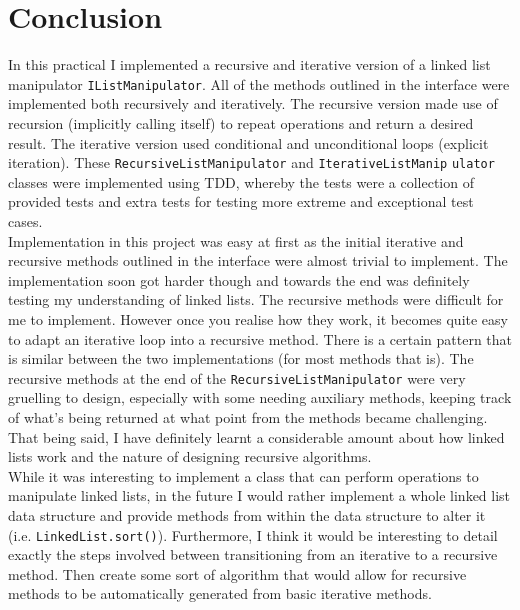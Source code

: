 \documentclass{article}
\begin{document}
\section{Conclusion}
In this practical I implemented a recursive and iterative version of a linked list manipulator \verb+IListManipulator+. All of the methods outlined in the interface were implemented both recursively and iteratively. The recursive version made use of recursion (implicitly calling itself) to repeat operations and return a desired result. The iterative version used conditional and unconditional loops (explicit iteration). These \verb+RecursiveListManipulator+ and \verb+IterativeListManip+ \verb+ulator+ classes were implemented using TDD, whereby the tests were a collection of provided tests and extra tests for testing more extreme and exceptional test cases. \\

\noindent Implementation in this project was easy at first as the initial iterative and recursive methods outlined in the interface were almost trivial to implement. The implementation soon got harder though and towards the end was definitely testing my understanding of linked lists. The recursive methods were difficult for me to implement. However once you realise how they work, it becomes quite easy to adapt an iterative loop into a recursive method. There is a certain pattern that is similar between the two implementations (for most methods that is). The recursive methods at the end of the \verb+RecursiveListManipulator+ were very gruelling to design, especially with some needing auxiliary methods, keeping track of what's being returned at what point from the methods became challenging. That being said, I have definitely learnt a considerable amount about how linked lists work and the nature of designing recursive algorithms.\\

\noindent
While it was interesting to implement a class that can perform operations to manipulate linked lists, in the future I would rather implement a whole linked list data structure and provide methods from within the data structure to alter it (i.e. \verb+LinkedList.sort()+). Furthermore, I think it would be interesting to detail exactly the steps involved between transitioning from an iterative to a recursive method. Then create some sort of algorithm that would allow for recursive methods to be automatically generated from basic iterative methods.
\end{document}
